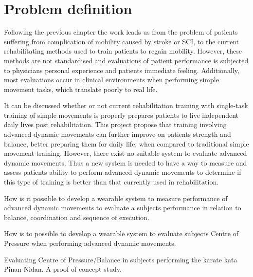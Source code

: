 \section{Problem definition}

Following the previous chapter the work leads us from the problem of patients suffering from complication of mobility caused by stroke or SCI, to the current rehabilitating methods used to train patients to regain mobility. 
However, these methods are not standardised and evaluations of patient performance is subjected to physicians personal experience and patients immediate feeling. Additionally, most evaluations occur in clinical environments when performing simple movement tasks, which translate poorly to real life. 

It can be discussed whether or not current rehabilitation training with single-task training of simple movements is properly prepares patients to live independent daily lives post rehabilitation. This project propose that training involving advanced dynamic movements can further improve on patients strength and balance, better preparing them for daily life, when compared to traditional simple movement training. 
However, there exist no suitable system to evaluate advanced dynamic movements. Thus a new system is needed to have a way to measure and assess patients ability to perform advanced dynamic movements to determine if this type of training is better than that currently used in rehabilitation. 


\begin{center}
How is it possible to develop a wearable system to measure performance of advanced dynamic movements to evaluate a subjects performance in relation to balance, coordination and sequence of execution.

How is to possible to develop a wearable system to evaluate subjects Centre of Pressure when performing advanced dynamic movements.

Evaluating Centre of Pressure/Balance in subjects performing the karate kata Pinan Nidan. A proof of concept study. 
\end{center}
